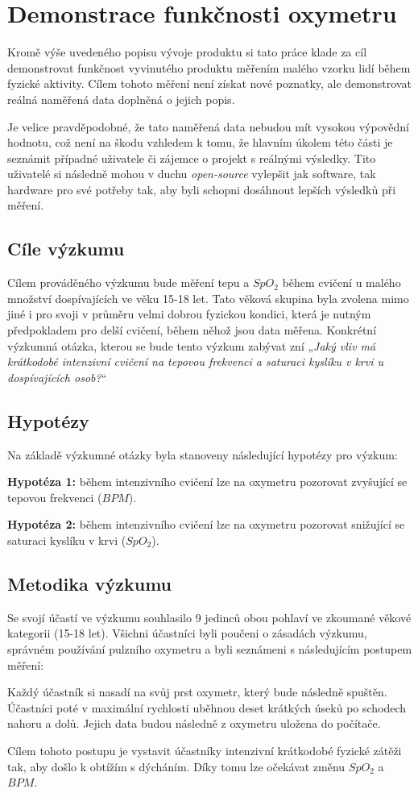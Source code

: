 \section{Demonstrace funkčnosti oxymetru}
Kromě výše uvedeného popisu vývoje produktu si tato práce klade za cíl demonstrovat funkčnost vyvinutého produktu měřením malého vzorku lidí během fyzické aktivity. Cílem tohoto měření není získat nové poznatky, ale demonstrovat reálná naměřená data doplněná o jejich popis.
\par Je velice pravděpodobné, že tato naměřená data nebudou mít vysokou výpovědní hodnotu, což není na škodu vzhledem k tomu, že hlavním úkolem této části je seznámit případné uživatele či zájemce o projekt s reálnými výsledky. Tito uživatelé si následně mohou v duchu \emph{open-source} vylepšit jak software, tak hardware pro své potřeby tak, aby byli schopni dosáhnout lepších výsledků při měření.
\subsection{Cíle výzkumu}
Cílem prováděného výzkumu bude měření tepu a $SpO_2$ během cvičení u malého množství dospívajících ve věku 15-18 let. Tato věková skupina byla zvolena mimo jiné i pro svoji v průměru velmi dobrou fyzickou kondici, která je nutným předpokladem pro delší cvičení, během něhož jsou data měřena. Konkrétní výzkumná otázka, kterou se bude tento výzkum zabývat zní „\emph{Jaký vliv má krátkodobé intenzivní cvičení na tepovou frekvenci a saturaci kyslíku v krvi u dospívajících osob?}“
\subsection{Hypotézy}
Na základě výzkumné otázky byla stanoveny následující hypotézy pro výzkum:
\par\textbf{Hypotéza 1:} během intenzivního cvičení lze na oxymetru pozorovat zvyšující se tepovou frekvenci ($BPM$).
\par\textbf{Hypotéza 2:} během intenzivního cvičení lze na oxymetru pozorovat snižující se saturaci kyslíku v krvi ($SpO_2$).
\subsection{Metodika výzkumu}
Se svojí účastí ve výzkumu souhlasilo 9 jedinců obou pohlaví ve zkoumané věkové kategorii (15-18 let). Všichni účastníci byli poučeni o zásadách výzkumu, správném používání pulzního oxymetru a byli seznámeni s následujícím postupem měření:
\par Každý účastník si nasadí na svůj prst oxymetr, který bude následně spuštěn. Účastníci poté v maximální rychlosti uběhnou deset krátkých úseků po schodech nahoru a dolů. Jejich data budou následně z oxymetru uložena do počítače.
\par Cílem tohoto postupu je vystavit účastníky intenzivní krátkodobé fyzické zátěži tak, aby došlo k obtížím s dýcháním. Díky tomu lze očekávat změnu $SpO_2$ a $BPM$.
